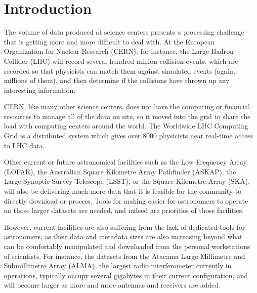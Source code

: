 \chapter{Introduction}


The volume of data produced at
science centers presents a
processing challenge
that is getting more and more difficult to deal with.
At the European Organization for Nuclear Research
(CERN), for instance,
the Large Hadron Collider (LHC) will record
several hundred million collision events,
which are recorded so that physicists can match them against simulated events (again, millions of them), and then determine if the collisions have thrown up any interesting information.

CERN, like many other science centers, does not have the computing or financial resources to manage all of the data
on site,
so it moved into the grid to share the load with computing centers around the world. The Worldwide LHC Computing Grid is a distributed system which gives over 8000 physicists near real-time access to LHC data.

Other current or future astronomical  facilities such as the Low-Frequency Array (LOFAR), the Australian Square Kilometre Array Pathfinder (ASKAP), the Large Synoptic Survey Telescope (LSST), or the Square Kilometre Array (SKA), will also be delivering much more data that it is feasible for the community to directly download or process. Tools for making easier for astronomers to operate on those larger datasets are needed, and indeed are priorities of those facilities.


However, current facilities are also suffering from the lack of dedicated tools for astronomers, as their data and metadata sizes are also increasing beyond what can be comfortably manipulated and downloaded from the personal workstations of scientists. For instance, the datasets from the Atacama Large Millimetre and Submillimetre Array (ALMA), the largest radio interferometer currently in operations, typically occupy several gigabytes in their current configuration, and will become larger as more and more antennas and receivers are added.

